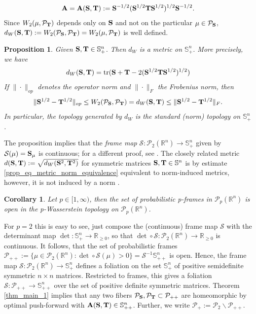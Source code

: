 \documentclass{amsart}
\numberwithin{equation}{section}
\newcommand\cP{{\mathcal P}}
\newcommand\bA{{\bf A}}
\newcommand\bS{{\bf S}}
\newcommand\bT{{\bf T}}
\newcommand\R{{\mathbb R}}
\newcommand\id{{\operatorname{\bf Id}}}
\newcommand\tr{{\operatorname{tr}}}
\theoremstyle{plain}
\newtheorem{proposition}[subsection]{Proposition}
\newtheorem{corollary}[subsection]{Corollary}
\theoremstyle{definition}
\begin{document}
\begin{equation}\label{AST}
    \bA=\bA(\bS,\bT):=\bS^{-1/2}(\bS^{1/2} \bT \bS^{1/2})^{1/2}\bS^{-1/2}.
\end{equation}
Since $ W_2(\mu, \cP_{\bT})$ depends only on $\bS$ and not on the particular $\mu \in \cP_{\bS}$, $d_W(\bS, \bT):=W_2(\cP_{\bS},\cP_{\bT})=W_2(\mu, \cP_{\bT})$ is well defined.  
\begin{proposition}\label{prop_metric_equivalence}
Given $\bS, \bT \in {\mathbb S}^n_{+}$. Then $d_W$ is a metric on  ${\mathbb S}^n_{+}$.  
More precisely, we have 
\begin{equation}\label{prop_eq_w_dist_symmetric}
d_W(\bS,\bT)=\tr (\bS +\bT - 2(\bS^{1/2}\bT\bS^{1/2})^{1/2}) %
\end{equation}
If $\|\cdot\|_{op}$ denotes the operator norm and $\|\cdot\|_{F}$ the Frobenius norm, then   
\begin{equation}\label{prop_eq_metric_norm_equivalence}  
\| \bS^{1/2}-\bT^{1/2} \|_{op} \leq W_2(\mathcal{P}_{\bf S}, \mathcal{P}_{\bf T})=d_W(\bS,\bT) \leq \| \bS^{1/2}-\bT^{1/2} \|_F.
\end{equation}
In particular, the topology generated by $d_W$ is the standard (norm) topology on ${\mathbb S}^n_{+}$. 
\end{proposition}
The proposition implies that the {\em frame map} $\mathcal{S}: \cP_2(\R^n) \rightarrow {\mathbb S}^n_{+}$ given
by $\mathcal{S}(\mu)=\bS_{\mu}$ is continuous; for a different proof, see \cite{wickman2023gradient}. 
The closely related metric $d(\bS, \bT):=\sqrt{d_W(\bS^2, \bT^2)}$ for symmetric matrices $\bS, \bT \in {\mathbb S}^n$ 
is by estimate \ref{prop_eq_metric_norm_equivalence} equivalent to norm-induced metrics, however, it
is not induced by a norm \cite{cuesta1996lower}.  
\begin{corollary} Let $p \in [1,\infty)$, then the set of probabilistic p-frames in $\cP_p(\R^n)$ is open in the p-Wasserstein topology on $\cP_p(\R^n)$.     
\end{corollary}
For $p=2$ this is easy to see, just compose the (continuous) frame map $\mathcal{S}$ with the determinant map $\det: {\mathbb S}^n_{+} \rightarrow \R_{\geq 0} $, so that $ \det \circ \mathcal{S}:  \cP_2(\mathbb{R}^n) \rightarrow \R_{\geq 0}$ is continuous. It follows, that the set of probabilistic frames 
$\cP_{++} := \{\mu \in \cP_2(\mathbb{R}^n): \det \circ \mathcal{S}(\mu)>0 \}= \mathcal{S}^{-1} {\mathbb S}^n_{++}$ is open. Hence, the frame map $\mathcal{S}: \cP_2(\R^n) \rightarrow {\mathbb S}^n_{+}$ defines a foliation on the set ${\mathbb S}^n_{+}$ of positive semidefinite symmetric $n \times n$ matrices. Restricted to frames, this gives a foliation $\mathcal{S}: \cP_{++} \rightarrow {\mathbb S}^n_{++}$ over the set of positive definite symmetric matrices. Theorem \ref{thm_main_1} implies that any two fibers $\cP_{\bS}, \cP_{\bT} \subset \cP_{++}$ are homeomorphic by optimal push-forward with $\bA(\bS, \bT) \in \mathbb{S}^n_{++}$. Further, we write $\cP_{+}:=\cP_{2}\backslash \cP_{++}$.\\ 
\end{document}
